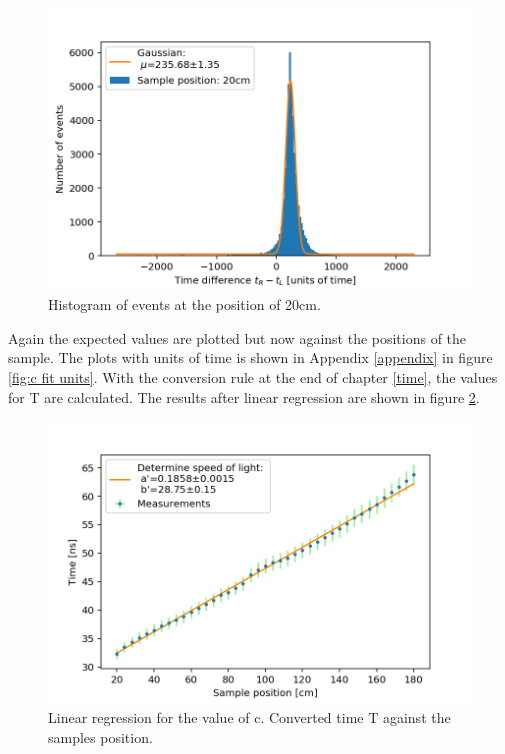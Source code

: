 \documentclass[]{article}
\begin{document}
\begin{figure}[H]
\centering
\includegraphics[width=1\textwidth]{Plots/Pos/20cm.png}
\caption{Histogram of events at the position of 20cm. }
\label{fig:histogram20}
\end{figure}

Again the expected values are plotted but now against the positions of the sample. The plots with units of time is shown in Appendix \ref{appendix} in figure \ref{fig:c fit units}. With the conversion rule at the end of chapter \ref{time}, the values for T are calculated. The results after linear regression are shown in figure \ref{fig:c fit}.

\begin{figure}[H]
\centering
\includegraphics[width=1\textwidth]{Plots/PosTime.png}
\caption{Linear regression for the value of c. Converted time T against the samples position. }
\label{fig:c fit}
\end{figure}
\end{document}
